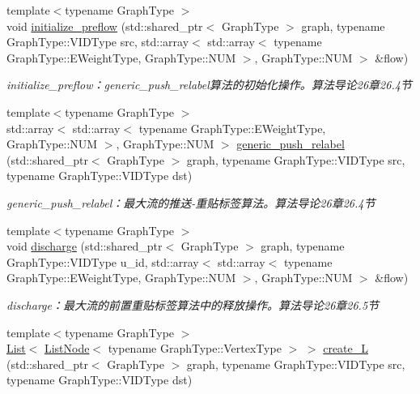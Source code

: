 \begin{DoxyCompactItemize}
{\footnotesize template$<$typename Graph\+Type $>$ }\\void \hyperlink{namespace_introduction_to_algorithm_1_1_graph_algorithm_aeaf3e258f5ae9aed76158255fa603c00}{initialize\+\_\+preflow} (std\+::shared\+\_\+ptr$<$ Graph\+Type $>$ graph, typename Graph\+Type\+::\+V\+I\+D\+Type src, std\+::array$<$ std\+::array$<$ typename Graph\+Type\+::\+E\+Weight\+Type, Graph\+Type\+::\+N\+U\+M $>$, Graph\+Type\+::\+N\+U\+M $>$ \&flow)
\begin{DoxyCompactList}\small\item\em initialize\+\_\+preflow：generic\+\_\+push\+\_\+relabel算法的初始化操作。算法导论26章26.4节 \end{DoxyCompactList}\item 
{\footnotesize template$<$typename Graph\+Type $>$ }\\std\+::array$<$ std\+::array$<$ typename Graph\+Type\+::\+E\+Weight\+Type, Graph\+Type\+::\+N\+U\+M $>$, Graph\+Type\+::\+N\+U\+M $>$ \hyperlink{namespace_introduction_to_algorithm_1_1_graph_algorithm_ab134ec014d01e25ec2ed7d2c97babe23}{generic\+\_\+push\+\_\+relabel} (std\+::shared\+\_\+ptr$<$ Graph\+Type $>$ graph, typename Graph\+Type\+::\+V\+I\+D\+Type src, typename Graph\+Type\+::\+V\+I\+D\+Type dst)
\begin{DoxyCompactList}\small\item\em generic\+\_\+push\+\_\+relabel：最大流的推送-\/重贴标签算法。算法导论26章26.4节 \end{DoxyCompactList}\item 
{\footnotesize template$<$typename Graph\+Type $>$ }\\void \hyperlink{namespace_introduction_to_algorithm_1_1_graph_algorithm_a2ae42c12c93664d94b5a6f9980fe8540}{discharge} (std\+::shared\+\_\+ptr$<$ Graph\+Type $>$ graph, typename Graph\+Type\+::\+V\+I\+D\+Type u\+\_\+id, std\+::array$<$ std\+::array$<$ typename Graph\+Type\+::\+E\+Weight\+Type, Graph\+Type\+::\+N\+U\+M $>$, Graph\+Type\+::\+N\+U\+M $>$ \&flow)
\begin{DoxyCompactList}\small\item\em discharge：最大流的前置重贴标签算法中的释放操作。算法导论26章26.5节 \end{DoxyCompactList}\item 
{\footnotesize template$<$typename Graph\+Type $>$ }\\\hyperlink{struct_introduction_to_algorithm_1_1_graph_algorithm_1_1_list}{List}$<$ \hyperlink{struct_introduction_to_algorithm_1_1_graph_algorithm_1_1_list_node}{List\+Node}$<$ typename Graph\+Type\+::\+Vertex\+Type $>$ $>$ \hyperlink{namespace_introduction_to_algorithm_1_1_graph_algorithm_ad6a1917551c87991625d8402593ec863}{create\+\_\+\+L} (std\+::shared\+\_\+ptr$<$ Graph\+Type $>$ graph, typename Graph\+Type\+::\+V\+I\+D\+Type src, typename Graph\+Type\+::\+V\+I\+D\+Type dst)

\end{DoxyCompactItemize}
